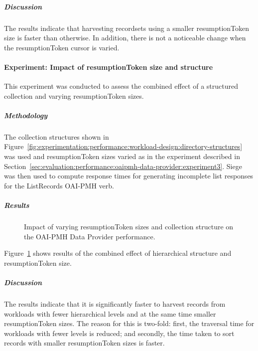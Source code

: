 \subparagraph{Discussion}

The results indicate that harvesting recordsets using a smaller resumptionToken size is faster than otherwise. In addition, there is not a noticeable change when the resumptionToken cursor is varied.

\paragraph{Experiment: Impact of resumptionToken size and structure}
\label{sec:evaluation:performance:oaipmh-data-provider:experiment4}

This experiment was conducted to assess the combined effect of a structured
collection and varying resumptionToken sizes.

\subparagraph{Methodology} %

The collection structures shown in Figure~\ref{fig:experimentation:performance:workload-design:directory-structures} was used and resumptionToken sizes varied as in the experiment described in Section~\ref{sec:evaluation:performance:oaipmh-data-provider:experiment3}. Siege was then used to compute response times for generating incomplete list responses for the ListRecords OAI-PMH verb.

\subparagraph{Results}

\begin{figure}
 \centering
 \framebox[\textwidth]{%

 }
 \caption[Impact of resumptionToken size\& structure on OAI-PMH]{Impact of varying resumptionToken sizes and collection structure on the OAI-PMH Data Provider performance.}
 \label{fig:experimentation:performance:oaipmh:resumptiontoken-size-level}
\end{figure}

Figure~\ref{fig:experimentation:performance:oaipmh:resumptiontoken-size-level} shows results of the combined effect of hierarchical structure and resumptionToken size.

\subparagraph{Discussion}

The results indicate that it is significantly faster to harvest records from workloads with fewer hierarchical levels and at the same time smaller resumptionToken sizes. The reason for this is two-fold: first, the traversal time for workloads with fewer levels is reduced; and secondly, the time taken to sort records with smaller resumptionToken sizes is faster.

